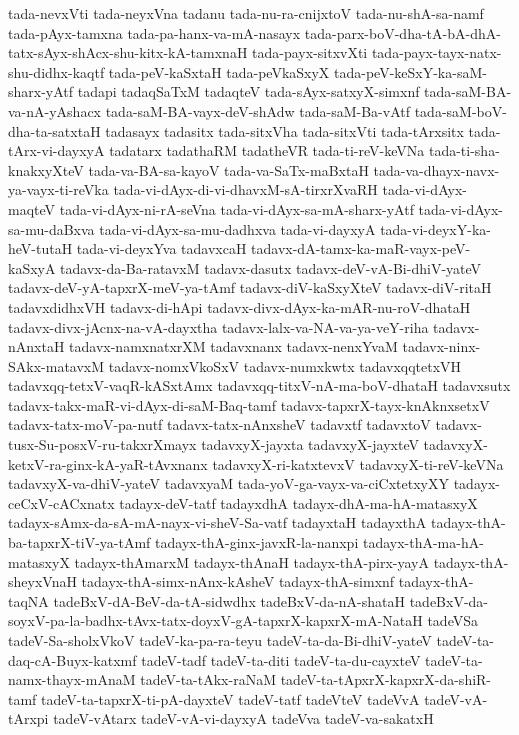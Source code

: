 {tada-nevxVti
tada-neyxVna
tadanu
tada-nu-ra-cnijxtoV
tada-nu-shA-sa-namf
tada-pAyx-tamxna
tada-pa-hanx-va-mA-nasayx
tada-parx-boV-dha-tA-bA-dhA-tatx-sAyx-shAcx-shu-kitx-kA-tamxnaH
tada-payx-sitxvXti
tada-payx-tayx-natx-shu-didhx-kaqtf
tada-peV-kaSxtaH
tada-peVkaSxyX
tada-peV-keSxY-ka-saM-sharx-yAtf
tadapi
tadaqSaTxM
tadaqteV
tada-sAyx-satxyX-simxnf
tada-saM-BA-va-nA-yAshacx
tada-saM-BA-vayx-deV-shAdw
tada-saM-Ba-vAtf
tada-saM-boV-dha-ta-satxtaH
tadasayx
tadasitx
tada-sitxVha
tada-sitxVti
tada-tArxsitx
tada-tArx-vi-dayxyA
tadatarx
tadathaRM
tadatheVR
tada-ti-reV-keVNa
tada-ti-sha-knakxyXteV
tada-va-BA-sa-kayoV
tada-va-SaTx-maBxtaH
tada-va-dhayx-navx-ya-vayx-ti-reVka
tada-vi-dAyx-di-vi-dhavxM-sA-tirxrXvaRH
tada-vi-dAyx-maqteV
tada-vi-dAyx-ni-rA-seVna
tada-vi-dAyx-sa-mA-sharx-yAtf
tada-vi-dAyx-sa-mu-daBxva
tada-vi-dAyx-sa-mu-dadhxva
tada-vi-dayxyA
tada-vi-deyxY-ka-heV-tutaH
tada-vi-deyxYva
tadavxcaH
tadavx-dA-tamx-ka-maR-vayx-peV-kaSxyA
tadavx-da-Ba-ratavxM
tadavx-dasutx
tadavx-deV-vA-Bi-dhiV-yateV
tadavx-deV-yA-tapxrX-meV-ya-tAmf
tadavx-diV-kaSxyXteV
tadavx-diV-ritaH
tadavxdidhxVH
tadavx-di-hApi
tadavx-divx-dAyx-ka-mAR-nu-roV-dhataH
tadavx-divx-jAcnx-na-vA-dayxtha
tadavx-lalx-va-NA-va-ya-veY-riha
tadavx-nAnxtaH
tadavx-namxnatxrXM
tadavxnanx
tadavx-nenxYvaM
tadavx-ninx-SAkx-matavxM
tadavx-nomxVkoSxV
tadavx-numxkwtx
tadavxqqtetxVH
tadavxqq-tetxV-vaqR-kASxtAmx
tadavxqq-titxV-nA-ma-boV-dhataH
tadavxsutx
tadavx-takx-maR-vi-dAyx-di-saM-Baq-tamf
tadavx-tapxrX-tayx-knAknxsetxV
tadavx-tatx-moV-pa-nutf
tadavx-tatx-nAnxsheV
tadavxtf
tadavxtoV
tadavx-tusx-Su-posxV-ru-takxrXmayx
tadavxyX-jayxta
tadavxyX-jayxteV
tadavxyX-ketxV-ra-ginx-kA-yaR-tAvxnanx
tadavxyX-ri-katxtevxV
tadavxyX-ti-reV-keVNa
tadavxyX-va-dhiV-yateV
tadavxyaM
tada-yoV-ga-vayx-va-ciCxtetxyXY
tadayx-ceCxV-cACxnatx
tadayx-deV-tatf
tadayxdhA
tadayx-dhA-ma-hA-matasxyX
tadayx-sAmx-da-sA-mA-nayx-vi-sheV-Sa-vatf
tadayxtaH
tadayxthA
tadayx-thA-ba-tapxrX-tiV-ya-tAmf
tadayx-thA-ginx-javxR-la-nanxpi
tadayx-thA-ma-hA-matasxyX
tadayx-thAmarxM
tadayx-thAnaH
tadayx-thA-pirx-yayA
tadayx-thA-sheyxVnaH
tadayx-thA-simx-nAnx-kAsheV
tadayx-thA-simxnf
tadayx-thA-taqNA
tadeBxV-dA-BeV-da-tA-sidwdhx
tadeBxV-da-nA-shataH
tadeBxV-da-soyxV-pa-la-badhx-tAvx-tatx-doyxV-gA-tapxrX-kapxrX-mA-NataH
tadeVSa
tadeV-Sa-sholxVkoV
tadeV-ka-pa-ra-teyu
tadeV-ta-da-Bi-dhiV-yateV
tadeV-ta-daq-cA-Buyx-katxmf
tadeV-tadf
tadeV-ta-diti
tadeV-ta-du-cayxteV
tadeV-ta-namx-thayx-mAnaM
tadeV-ta-tAkx-raNaM
tadeV-ta-tApxrX-kapxrX-da-shiR-tamf
tadeV-ta-tapxrX-ti-pA-dayxteV
tadeV-tatf
tadeVteV
tadeVvA
tadeV-vA-tArxpi
tadeV-vAtarx
tadeV-vA-vi-dayxyA
tadeVva
tadeV-va-sakatxH
}
